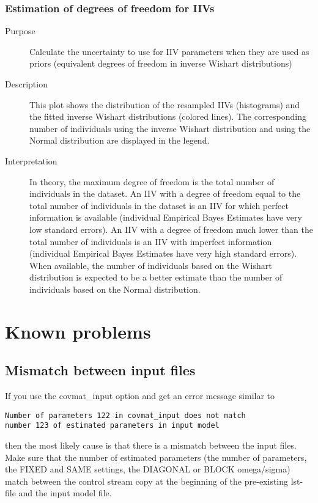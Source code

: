 \subsubsection{Estimation of degrees of freedom for IIVs }
\begin{description}
\item[Purpose] Calculate the uncertainty to use for IIV parameters when they are used as priors (equivalent degrees of freedom in inverse Wishart distributions) 
\item[Description] This plot shows the distribution of the resampled IIVs (histograms) and the fitted inverse Wishart distributions (colored lines). The corresponding number of individuals using the inverse Wishart distribution and using the Normal distribution are displayed in the legend.
\item[Interpretation] In theory, the maximum degree of freedom is the total number of individuals in the dataset. An IIV with a degree of freedom equal to the total number of individuals in the dataset is an IIV for which perfect information is available (individual Empirical Bayes Estimates have very low standard errors). An IIV with a degree of freedom much lower than the total number of individuals is an IIV with imperfect information (individual Empirical Bayes Estimates have very high standard errors). When available, the number of individuals based on the Wishart distribution is expected to be a better estimate than the number of individuals based on the Normal distribution.
\end{description}

\section{Known problems}
\subsection*{Mismatch between input files}
If you use the covmat\_input option and get an error message similar to
\begin{verbatim}
Number of parameters 122 in covmat_input does not match
number 123 of estimated parameters in input model
\end{verbatim}
then the most likely cause is that there is a mismatch between the input files. Make sure that the number of estimated parameters (the number of parameters, the FIXED and SAME settings, the DIAGONAL or BLOCK omega/sigma) match between the control stream copy at the beginning of the pre-existing lst-file and the input model file.
